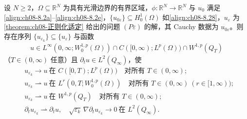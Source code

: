 \documentclass[../../main.tex]{subfiles}%
\begin{document}
\begin{proposition}\label{proposition:ch08-收敛N2}
设 $N\geqslant2$，$\Omega\subseteq\mathbb{R}^N$ 为具有光滑边界的有界区域，$\phi:\mathbb{R}^N\to\mathbb{R}^N$ 与 $u_0$ 满足\eqref{align:ch08-8.2a}--\eqref{align:ch08-8.2e}，$\{u_{0\varepsilon}\}\subseteq H^1_0(\Omega)$ 如\eqref{align:ch08-8.28}，$u_\varepsilon$ 为\cref{theorem:ch08-正则化适定} 给出的问题 $(P\varepsilon)$ 的解，其 Cauchy 数据为 $u_{0\varepsilon}$。则存在序列 $\{u_{\varepsilon_k}\}\subseteq\{u_\varepsilon\}$ 与函数
\begin{align*}
u\in L^\infty(0,\infty;W^{1,p}_0(\Omega))\cap C([0,\infty);L^p(\Omega))\cap W^{1,p}(Q_T)
\end{align*}
（$T\in(0,\infty)$ 任意）且 $\partial_tu\in L^2(Q_\infty)$，使
\begin{align}
&u_{\varepsilon_k}\to u\ \text{在 }C([0,T);L^p(\Omega))\quad\text{对所有 }T\in(0,\infty); \label{align:ch08-8.36a}\\
&u_{\varepsilon_k}\rightharpoonup u\ \text{在 }L^r(0,T;W^{1,p}_0(\Omega))\quad\text{对所有 }T\in(0,\infty)\ (r\in[1,\infty)); \label{align:ch08-8.36b}\\
&u_{\varepsilon_k}\rightharpoonup u\ \text{在 }W^{1,p}(Q_T)\quad\text{对所有 }T\in(0,\infty); \label{align:ch08-8.36c}\\
&\partial_t u_{\varepsilon_k}\rightharpoonup\partial_t u,\quad
\sqrt{\varepsilon_k}\,\nabla\partial_t u_{\varepsilon_k}\to0\ \text{在 }L^2(Q_\infty). \label{align:ch08-8.36d}
\end{align}
\end{proposition}
\end{document}
